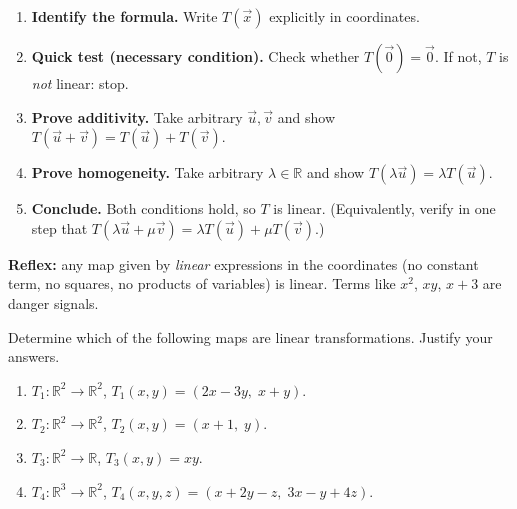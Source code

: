 \documentclass[11pt]{article}
\begin{document}
\begin{methode}
\begin{enumerate}
\item \textbf{Identify the formula.} Write $T(\vec{x})$ explicitly in coordinates.
\item \textbf{Quick test (necessary condition).} Check whether $T(\vec{0})=\vec{0}$. If not, $T$ is \emph{not} linear: stop.
\item \textbf{Prove additivity.} Take arbitrary $\vec{u},\vec{v}$ and show $T(\vec{u}+\vec{v})=T(\vec{u})+T(\vec{v})$.
\item \textbf{Prove homogeneity.} Take arbitrary $\lambda\in\mathbb{R}$ and show $T(\lambda\vec{u})=\lambda T(\vec{u})$.
\item \textbf{Conclude.} Both conditions hold, so $T$ is linear. (Equivalently, verify in one step that $T(\lambda\vec{u}+\mu\vec{v})=\lambda T(\vec{u})+\mu T(\vec{v})$.)
\end{enumerate}
\textbf{Reflex:} any map given by \emph{linear} expressions in the coordinates (no constant term, no squares, no products of variables) is linear. Terms like $x^2$, $xy$, $x+3$ are danger signals.
\end{methode}

\begin{exemplebox}
Determine which of the following maps are linear transformations. Justify your answers.
\begin{enumerate}
\item $T_1:\mathbb{R}^2\to\mathbb{R}^2$, \quad $T_1(x,y)=(2x-3y,\;x+y)$.
\item $T_2:\mathbb{R}^2\to\mathbb{R}^2$, \quad $T_2(x,y)=(x+1,\;y)$.
\item $T_3:\mathbb{R}^2\to\mathbb{R}$, \quad $T_3(x,y)=xy$.
\item $T_4:\mathbb{R}^3\to\mathbb{R}^2$, \quad $T_4(x,y,z)=(x+2y-z,\;3x-y+4z)$.
\end{enumerate}
\end{exemplebox}
\end{document}
